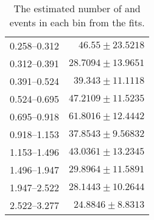 \begin{table}[p]
\begin{center}
\begin{tabular}{@{}l r@{}}
            0.258--0.312  &  $46.55    \pm  23.5218$  \\
            0.312--0.391  &  $28.7094  \pm  13.9651$  \\
            0.391--0.524  &  $39.343   \pm  11.1118$  \\
            0.524--0.695  &  $47.2109  \pm  11.5235$  \\
            0.695--0.918  &  $61.8016  \pm  12.4442$  \\
            0.918--1.153  &  $37.8543  \pm  9.56832$  \\
            1.153--1.496  &  $43.0361  \pm  13.2345$  \\
            1.496--1.947  &  $29.8964  \pm  11.5891$  \\
            1.947--2.522  &  $28.1443  \pm  10.2644$  \\
            2.522--3.277  &  $24.8846  \pm  8.8313$   \\
            \bottomrule
        \end{tabular}
    \end{center}
    \caption{
        The estimated number of \QCDjets and \wjets events in each \phistar bin
        from the fits.
    }
    \label{table:qcd_fits}
\end{table}
